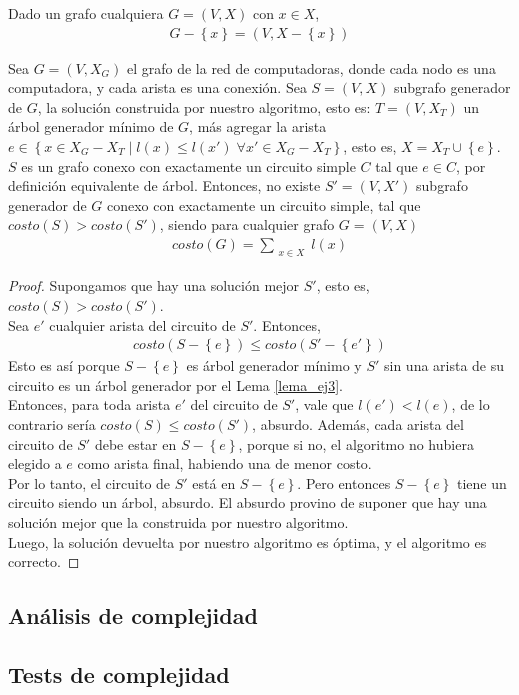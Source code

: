 \begin{notacion}
Dado un grafo cualquiera $G = (V,X)$ con $x \in X$, 
\begin{align*}
G - \left\{x\right\} = (V, X - \left\{x\right\})
\end{align*}
\end{notacion}

\begin{correctitud}
Sea $G = (V,X_G)$ el grafo de la red de computadoras, donde cada nodo es una computadora, y cada arista es una conexión. Sea $S = (V,X)$ subgrafo generador de $G$, la solución construida por nuestro algoritmo, esto es: $T = (V, X_T)$ un árbol generador mínimo de $G$, más agregar la arista $e \in \left\{x \in X_G - X_T \mid l(x) \leq l(x') \; \forall x' \in X_G - X_T \right\}$, esto es, $X = X_T \cup \left\{e\right\}$. $S$ es un grafo conexo con exactamente un circuito simple $C$ tal que $e \in C$, por definición equivalente de árbol. Entonces, no existe $S' = (V,X')$ subgrafo generador de $G$ conexo con exactamente un circuito simple, tal que $costo(S) > costo(S')$, siendo para cualquier grafo $G = (V,X)$
\begin{align*}
costo(G) = \sum\limits_{\substack{x \in X}} l(x)
\end{align*}
\end{correctitud}
\begin{proof}
Supongamos que hay una solución mejor $S'$, esto es, $costo(S) > costo(S')$. \\
\noindent Sea $e'$ cualquier arista del circuito de $S'$. Entonces,
\begin{align*}
costo(S - \left\{e\right\}) \leq costo(S' - \left\{e'\right\})
\end{align*}
Esto es así porque $S - \left\{e\right\}$ es árbol generador mínimo y $S'$ sin una arista de su circuito es un árbol generador por el Lema \ref{lema_ej3}. \\
Entonces, para toda arista $e'$ del circuito de $S'$, vale que $l(e') < l(e)$, de lo contrario sería $costo(S) \leq costo(S')$, absurdo.
Además, cada arista del circuito de $S'$ debe estar en $S - \left\{e\right\}$, porque si no, el algoritmo no hubiera elegido a $e$ como arista final, habiendo una de menor costo. \\
Por lo tanto, el circuito de $S'$ está en $S - \left\{e\right\}$. Pero entonces $S - \left\{e\right\}$ tiene un circuito siendo un árbol, absurdo. El absurdo provino de suponer que hay una solución mejor que la construida por nuestro algoritmo. \\
Luego, la solución devuelta por nuestro algoritmo es óptima, y el algoritmo es correcto.
\end{proof}

\subsection{Análisis de complejidad}

\subsection{Tests de complejidad}

